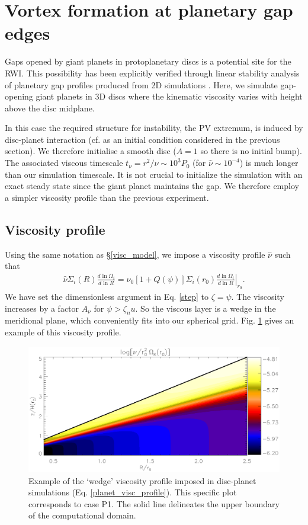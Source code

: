\section{Vortex formation at planetary gap edges}
Gaps opened by giant planets in protoplanetary discs is a potential site for 
the RWI. This possibility has been explicitly verified through 
linear stability analysis of planetary gap profiles 
produced from 2D simulations \citep{valborro07,lin10}. Here, we
simulate gap-opening giant planets in 3D discs where the kinematic viscosity  
varies with height above the disc midplane. 

In this case the required structure for instability, the PV extremum, 
is induced by disc-planet interaction (cf. as an initial condition considered in the
previous section). We therefore initialise a
smooth disc ($A=1$ so there is no initial bump). The associated viscous timescale
$t_\nu=r^2/\nu\sim 10^3P_0$ (for $\hat{\nu}\sim 10^{-4}$) is much
longer than our simulation timescale. It is not crucial to initialize
the simulation with an exact steady state since the giant planet
maintains the gap. We therefore employ a simpler viscosity profile than
the previous experiment.   

\subsection{Viscosity profile}\label{planet_visc_mode}
Using the same notation as \S\ref{visc_model}, we impose a viscosity
profile $\hat{\nu}$ such that 
\begin{align}\label{planet_visc_profile}
  \hat{\nu}\Sigma_i(R)\frac{d\ln{\Omega_i}}{d\ln{R}} =
  \hat{\nu}_0\left[1+Q(\psi)\right]\Sigma_i(r_0)\left.\frac{d\ln{\Omega_i}}{d\ln{R}}\right|_{r_0}.      
\end{align}
We have set the dimensionless argument in Eq. \ref{step} to
$\zeta=\psi$. The viscosity increases by a factor $A_\nu$ for 
$\psi > \zeta_nu$. So the viscous layer is 
a wedge in the meridional plane, which conveniently fits into our
spherical grid. Fig. \ref{planet_visc2d} gives an example of this
viscosity profile.  

\begin{figure}
  \centering
  \includegraphics[width=\linewidth]{figures/pdisk_visc2d_planet}
  \caption{Example of the `wedge' viscosity profile
    imposed in disc-planet simulations (Eq. \ref{planet_visc_profile}). This specific plot
    corresponds to case P1. The solid line
    delineates the upper boundary of the computational domain.
    \label{planet_visc2d}}
\end{figure}

